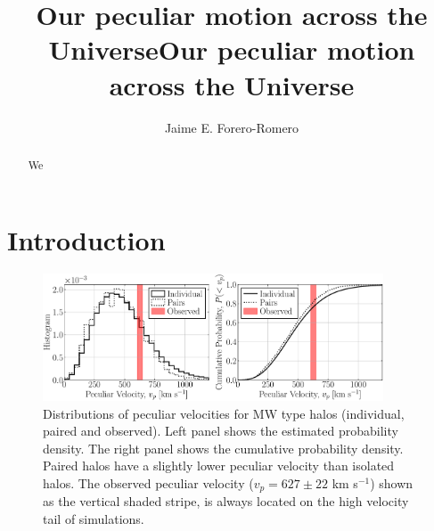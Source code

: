 \documentclass[onecolumn]{aastex62}
\title{Our peculiar motion across the Universe}
\begin{document}
\title{Our peculiar motion across the Universe}

\author{Jaime E. Forero-Romero}


\begin{abstract}
We
\end{abstract}

\section{Introduction}


\cite{2009PhRvD..80d3005E}





\begin{figure}
\begin{center}
  \includegraphics[width=0.9\textwidth]{cumulative_probability_18.pdf}
\end{center}
\caption{Distributions of peculiar velocities for MW type halos
  (individual, paired and observed). 
  Left panel shows the estimated probability density.
  The right panel shows the cumulative probability density.
  Paired halos have a slightly lower peculiar velocity than isolated
  halos.
  The observed peculiar velocity ($v_p=627\pm22$ km s$^{-1}$) shown as
  the vertical shaded stripe, is always located on the high velocity
  tail of simulations.}
\label{fig:proba}
\end{figure} 
\end{document}
